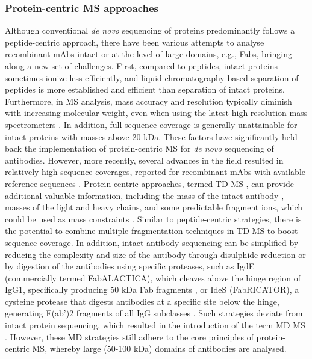 \subsubsection{Protein-centric MS approaches}
Although conventional \emph{de novo} sequencing of proteins predominantly follows a peptide-centric approach, there have been various attempts to analyse recombinant mAbs intact or at the level of large domains, e.g., Fabs, bringing along a new set of challenges. First, compared to peptides, intact proteins sometimes ionize less efficiently, and liquid-chromatography-based separation of peptides is more established and efficient than separation of intact proteins. Furthermore, in MS analysis, mass accuracy and resolution typically diminish with increasing molecular weight, even when using the latest high-resolution mass spectrometers \cite{tamara2021high-resolution, donnelly2019best, lössl2014boundaries}. In addition, full sequence coverage is generally unattainable for intact proteins with masses above 20 kDa. These factors have significantly held back the implementation of protein-centric MS for \emph{de novo} sequencing of antibodies. However, more recently, several advances in the field resulted in relatively high sequence coverages, reported for recombinant mAbs with available reference sequences \cite{fornelli2014middle-down, mao2013top-down, tsybin2011structural, resemann2016full}. Protein-centric approaches, termed TD MS \cite{toby2016progress}, can provide additional valuable information, including the mass of the intact antibody \cite{donnelly2019best}, masses of the light and heavy chains, and some predictable fragment ions, which could be used as mass constraints \cite{bondt2021human, greisch2021generating, boer2020selectivity, greisch2021extending, srzentić2020interlaboratory}.
Similar to peptide-centric strategies, there is the potential to combine multiple fragmentation techniques in TD MS to boost sequence coverage. In addition, intact antibody sequencing can be simplified by reducing the complexity and size of the antibody through disulphide reduction or by digestion of the antibodies using specific proteases, such as IgdE (commercially termed FabALACTICA), which cleaves above the hinge region of IgG1, specifically producing 50 kDa Fab fragments \cite{spoerry2016identification}, or IdeS (FabRICATOR), a cysteine protease that digests antibodies at a specific site below the hinge, generating F(ab’)2 fragments of all IgG subclasses \cite{johansson2008ides:}. Such strategies deviate from intact protein sequencing, which resulted in the introduction of the term MD MS \cite{lermyte2019top}. However, these MD strategies still adhere to the core principles of protein-centric MS, whereby large (50-100 kDa) domains of antibodies are analysed.
